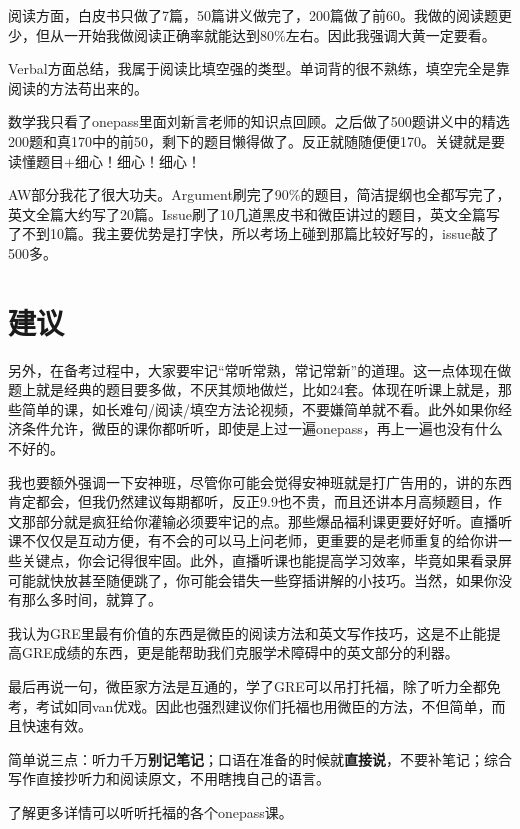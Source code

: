 \documentclass[cn,plain]{elegantbookex}
\begin{document}
阅读方面，白皮书只做了7篇，50篇讲义做完了，200篇做了前60。我做的阅读题更少，但从一开始我做阅读正确率就能达到80\%左右。因此我强调大黄一定要看。

Verbal方面总结，我属于阅读比填空强的类型。单词背的很不熟练，填空完全是靠阅读的方法苟出来的。

数学我只看了onepass里面刘新言老师的知识点回顾。之后做了500题讲义中的精选200题和真170中的前50，剩下的题目懒得做了。反正就随随便便170。关键就是要读懂题目+细心！细心！细心！

AW部分我花了很大功夫。Argument刷完了90\%的题目，简洁提纲也全都写完了，英文全篇大约写了20篇。Issue刷了10几道黑皮书和微臣讲过的题目，英文全篇写了不到10篇。我主要优势是打字快，所以考场上碰到那篇比较好写的，issue敲了500多。

\section{建议}
另外，在备考过程中，大家要牢记``常听常熟，常记常新''的道理。这一点体现在做题上就是经典的题目要多做，不厌其烦地做烂，比如24套。体现在听课上就是，那些简单的课，如长难句/阅读/填空方法论视频，不要嫌简单就不看。此外如果你经济条件允许，微臣的课你都听听，即使是上过一遍onepass，再上一遍也没有什么不好的。

我也要额外强调一下安神班，尽管你可能会觉得安神班就是打广告用的，讲的东西肯定都会，但我仍然建议每期都听，反正9.9也不贵，而且还讲本月高频题目，作文那部分就是疯狂给你灌输必须要牢记的点。那些爆品福利课更要好好听。直播听课不仅仅是互动方便，有不会的可以马上问老师，更重要的是老师重复的给你讲一些关键点，你会记得很牢固。此外，直播听课也能提高学习效率，毕竟如果看录屏可能就快放甚至随便跳了，你可能会错失一些穿插讲解的小技巧。当然，如果你没有那么多时间，就算了。

我认为GRE里最有价值的东西是微臣的阅读方法和英文写作技巧，这是不止能提高GRE成绩的东西，更是能帮助我们克服学术障碍中的英文部分的利器。

最后再说一句，微臣家方法是互通的，学了GRE可以吊打托福，除了听力全都免考，考试如同van优戏。因此也强烈建议你们托福也用微臣的方法，不但简单，而且快速有效。

简单说三点：听力千万\textbf{别记笔记}；口语在准备的时候就\textbf{直接说}，不要补笔记；综合写作直接抄听力和阅读原文，不用瞎拽自己的语言。

了解更多详情可以听听托福的各个onepass课。

\begin{center}\Huge\heiti
{}
\end{center}
\end{document}
